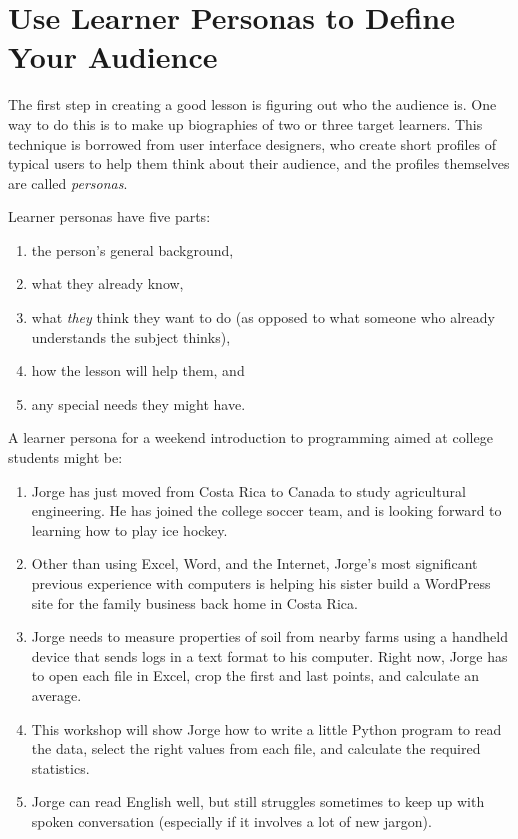 \documentclass[10pt,letterpaper]{article}
\newcommand{\rulemajor}[1]{\section{#1}}
\begin{document}
\rulemajor{Use Learner Personas to Define Your Audience}

The first step in creating a good lesson is figuring out who the audience is.
One way to do this is to make up biographies of two or three target learners.
This technique is borrowed from user interface designers, who create short
profiles of typical users to help them think about their audience, and the
profiles themselves are called \emph{personas}.

Learner personas have five parts:

\begin{enumerate}

\item the person's general background,

\item what they already know,

\item what \emph{they} think they want to do (as opposed to what someone who
  already understands the subject thinks),

\item how the lesson will help them, and

\item any special needs they might have.

\end{enumerate}

A learner persona for a weekend introduction to programming aimed at college
students might be:

\begin{enumerate}

\item Jorge has just moved from Costa Rica to Canada to study agricultural
  engineering. He has joined the college soccer team, and is looking forward to
  learning how to play ice hockey.

\item Other than using Excel, Word, and the Internet, Jorge's most significant
  previous experience with computers is helping his sister build a WordPress
  site for the family business back home in Costa Rica.

\item Jorge needs to measure properties of soil from nearby farms using a
  handheld device that sends logs in a text format to his computer.  Right now,
  Jorge has to open each file in Excel, crop the first and last points, and
  calculate an average.

\item This workshop will show Jorge how to write a little Python program to read
  the data, select the right values from each file, and calculate the required
  statistics.

\item Jorge can read English well, but still struggles sometimes to keep up with
  spoken conversation (especially if it involves a lot of new jargon).

\end{enumerate}
\end{document}
